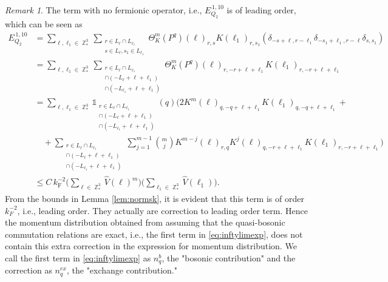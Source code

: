 \documentclass[12pt,a4paper]{article}
\numberwithin{equation}{section}
\newcommand{\1}{\mathbb{I}}
\newcommand{\F}{\mathrm{F}}
\DeclareMathOperator{\Z}{\mathbb{Z}}
\newcommand{\half}{\frac{1}{2}}
\newcommand{\eva}[1]{\left\langle #1 \right\rangle}
\theoremstyle{plain}
\newtheorem{lemma}[theorem]{Lemma}
\theoremstyle{definition}
\theoremstyle{remark}
\newtheorem{remark}[theorem]{Remark}
\theoremstyle{plain}
\theoremstyle{definition}
\theoremstyle{remark}
\begin{document}
\begin{remark} \label{rem:leadorder}
	The term with no fermionic operator, i.e., $E^{\,1,10}_{Q_2}$ is of leading order, which can be seen as 
	\begin{align}
		E^{\,1,10}_{Q_2} &= \sum\limits_{\ell,\ell_1 \in \Z^3_*}\sum\limits_{\substack{r\in L_{\ell} \cap L_{\ell_1}\\ s \in L_{\ell},s_1\in L_{\ell_1}}} \!\!\!\Theta^m_{K}(P^q)(\ell)_{r,s}K(\ell_1)_{r,s_1}(\delta_{-s+\ell,r-\ell_1}\delta_{-s_1+\ell_1,r-\ell}\delta_{s,s_1}) \nonumber\\
		&= \sum\limits_{\ell,\ell_1 \in \Z^3_*}\sum\limits_{\substack{r\in L_{\ell} \cap L_{\ell_1}\\ \cap (-L_{\ell}+\ell+\ell_1) \\ \cap (-L_{\ell_1}+\ell+\ell_1 )}} \!\!\!\Theta^m_{K}(P^q)(\ell)_{r,-r+\ell+\ell_1}K(\ell_1)_{r,-r+\ell+\ell_1}\nonumber\\
		&= \sum\limits_{\ell,\ell_1 \in \Z^3_*}\mathds{1}_{\substack{r\in L_{\ell} \cap L_{\ell_1}\\ \cap (-L_{\ell}+\ell+\ell_1) \\ \cap (-L_{\ell_1}+\ell+\ell_1 )}}(q)\Bigg( 2 K^m(\ell )_{q,-q+\ell+\ell_1}K(\ell_1)_{q,-q+\ell+\ell_1}+ \nonumber \\  &\quad +\sum\limits_{\substack{r\in L_{\ell} \cap L_{\ell_1}\\ \cap (-L_{\ell}+\ell+\ell_1) \\ \cap (-L_{\ell_1}+\ell+\ell_1 )}} \sum\limits_{j=1}^{m-1} {{m}\choose j}K^{m-j}(\ell)_{r,q} K^{j}(\ell)_{q,-r+\ell+\ell_1} K(\ell_1)_{r,-r+\ell+\ell_1} \Bigg)\nonumber\\
		&\leq C\,  k_{\F}^{-2} \Bigg(\sum\limits_{\ell \in \Z^3_*} \hat{V}(\ell)^m\Bigg)\Bigg( \sum\limits_{\ell_1 \in \Z^3_*} \hat{V}(\ell_1) \Bigg).
	\end{align} 
	From the bounds in Lemma \ref{lem:normsk}, it is evident that this term is of order $k_F^{-2}$, i.e., leading order.
	They actually are correction to leading order term. Hence the momentum distribution obtained from assuming that the quasi-bosonic commutation relations are exact, i.e., the first term in \eqref{eq:inftylimexp}, does not contain this extra correction in the expression for momentum distribution. We call the first term in \eqref{eq:inftylimexp} as $n_q^b$, the "bosonic contribution" and the correction as $n_q^{ex}$, the "exchange contribution."
\end{remark}


\end{document}
